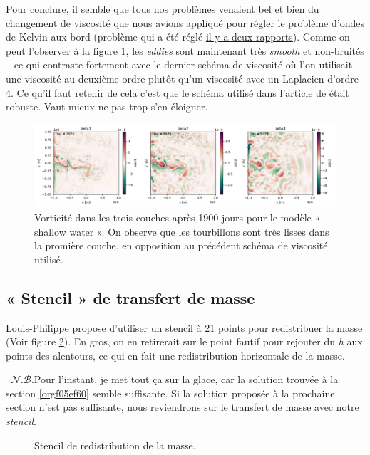 \documentclass[10pt]{article}
\numberwithin{equation}{section}
\newcommand{\nb}{\raisebox{0.8pt}{\scriptsize\textleaf}\ $\mathscr{N. B.}$\hspace{4pt}}
\begin{document}
Pour conclure, il semble que tous nos problèmes venaient bel et bien du changement de viscosité que nous avions appliqué pour régler le problème d'ondes de Kelvin aux bord (problème qui a été réglé \href{rapport-2023-10-06.pdf}{il y a deux rapports}).
Comme on peut l'observer à la figure \ref{fig:org0b377de}, les \emph{eddies} sont maintenant très \emph{smooth} et non-bruités -- ce qui contraste fortement avec le dernier schéma de viscosité où l'on utilisait une viscosité au deuxième ordre plutôt qu'un viscosité avec un Laplacien d'ordre 4.
Ce qu'il faut retenir de cela c'est que le schéma utilisé dans l'article de  était robuste.
Vaut mieux ne pas trop s'en éloigner. 

\begin{figure}[htbp]
\centering
\includegraphics[width=.9\linewidth]{figures/debuggage/2023_10_17_smooth_zeta.png}
\caption{\label{fig:org0b377de}Vorticité dans les trois couches après 1900 jours pour le modèle « shallow water ». On observe que les tourbillons sont très lisses dans la promière couche, en opposition au précédent schéma de viscosité utilisé.}
\end{figure}


\subsection{« Stencil » de transfert de masse}
\label{sec:orge2cf174}
Louis-Philippe propose d'utiliser un stencil à 21 points pour redistribuer la masse (Voir figure \ref{orge64b552}).
En gros, on en retirerait sur le point fautif pour rejouter du \emph{h} aux points des alentours, ce qui en fait une redistribution horizontale de la masse.\bigskip

\nb Pour l'instant, je met tout ça sur la glace, car la solution trouvée à la section \ref{orgf05ef60} semble suffisante.
Si la solution proposée à la prochaine section n'est pas suffisante, nous reviendrons sur le transfert de masse avec notre \emph{stencil}. 

\begin{figure}[!h]
\centering
{}
\caption{\label{orge64b552}Stencil de redistribution de la masse.}
\end{figure}
\end{document}
